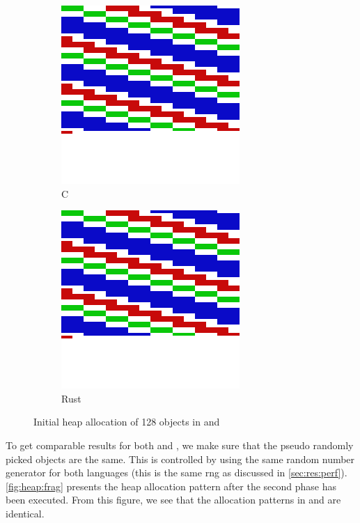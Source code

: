 \begin{figure}[H]

  \centering
  \begin{subfigure}{0.47\textwidth}
    \centering
    \includegraphics[scale=0.15]{results/plots/heap/cinit}
    \caption{C}
    \label{fig:heap:init:c}
  \end{subfigure}
  \hfill
  \begin{subfigure}{0.47\textwidth}
      \centering
    \includegraphics[scale=0.15]{results/plots/heap/rinit}
    \caption{Rust}
    \label{fig:heap:init:r}
  \end{subfigure}
  \caption{Initial heap allocation of 128 objects in {\rust} and {\C}}
  \label{fig:heap:init}

\end{figure}

To get comparable results for both {\C} and {\rust}, we make sure that the pseudo randomly picked objects are the same.
This is controlled by using the same random number generator for both languages (this is the same \gls{rng} as discussed in \autoref{sec:res:perf}).
\autoref{fig:heap:frag} presents the heap allocation pattern after the second phase has been executed.
From this figure, we see that the allocation patterns in {\rust} and {\C} are identical.

